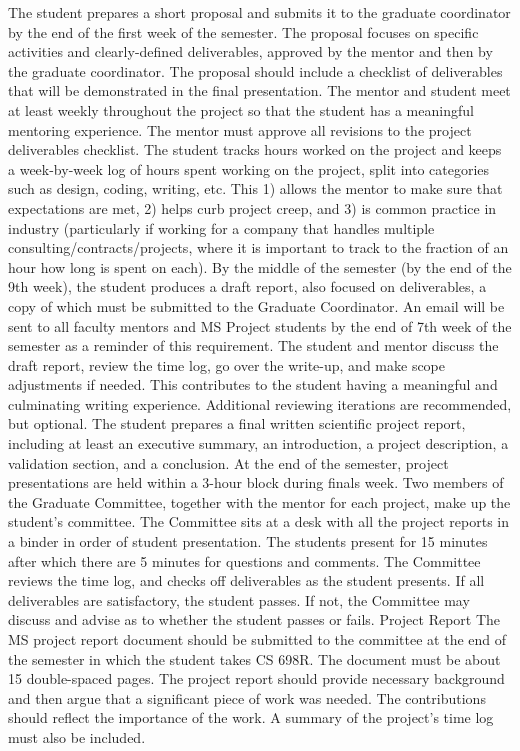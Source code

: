 \documentclass[ms,electronic,oneside,twosidetoc,letterpaper,chaptercenter,parttop]{byumsphd}
\begin{document}
The student prepares a short proposal and submits it to the graduate coordinator by the end of the first week of the semester.  The proposal focuses on specific activities and clearly-defined deliverables, approved by the mentor and then by the graduate coordinator.  The proposal should include a checklist of deliverables that will be demonstrated in the final presentation.
The mentor and student meet at least weekly throughout the project so that the student has a meaningful mentoring experience. The mentor must approve all revisions to the project deliverables checklist.
The student tracks hours worked on the project and keeps a week-by-week log of hours spent working on the project, split into categories such as design, coding, writing, etc. This 1) allows the mentor to make sure that expectations are met, 2) helps curb project creep, and 3) is common practice in industry (particularly if working for a company that handles multiple consulting/contracts/projects, where it is important to track to the fraction of an hour how long is spent on each).
By the middle of the semester (by the end of the 9th week), the student produces a draft report, also focused on deliverables, a copy of which must be submitted to the Graduate Coordinator. An email will be sent to all faculty mentors and MS Project students by the end of 7th week of the semester as a reminder of this requirement. The student and mentor discuss the draft report, review the time log, go over the write-up, and make scope adjustments if needed. This contributes to the student having a meaningful and culminating writing experience.  Additional reviewing iterations are recommended, but optional.
The student prepares a final written scientific project report, including at least an executive summary, an introduction, a project description, a validation section, and a conclusion.
At the end of the semester, project presentations are held within a 3-hour block during finals week. Two members of the Graduate Committee, together with the mentor for each project, make up the student's committee. The Committee sits at a desk with all the project reports in a binder in order of student presentation. The students present for 15 minutes after which there are 5 minutes for questions and comments. The Committee reviews the time log, and checks off deliverables as the student presents. If all deliverables are satisfactory, the student passes. If not, the Committee may discuss and advise as to whether the student passes or fails.
Project Report
The MS project report document should be submitted to the committee at the end of the semester in which the student takes CS 698R. The document must be about 15 double-spaced pages. The project report should provide necessary background and then argue that a significant piece of work was needed. The contributions should reflect the importance of the work. A summary of the project's time log must also be included. 
\end{document}

